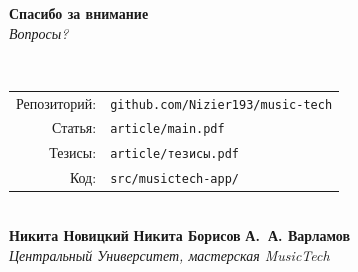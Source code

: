 \begin{frame}[plain]
  \vfill
  \begin{center}
    {\Huge\bfseries Спасибо за внимание}\\[1em]
    {\large\itshape Вопросы?}\\[1.5em]

    \\[1em]

    \small
    \begin{tabular}{rl}
      Репозиторий: & \texttt{github.com/Nizier193/music-tech}\\[0.2em]
      Статья: & \texttt{article/main.pdf}\\[0.2em]
      Тезисы: & \texttt{article/тезисы.pdf}\\[0.2em]
      Код: & \texttt{src/musictech-app/}
    \end{tabular}\\[1.5em]

    \textbf{Никита Новицкий} \quad\textbar\quad
    \textbf{Никита Борисов} \quad\textbar\quad
    \textbf{А.~А. Варламов}\\
    {\itshape Центральный Университет, мастерская MusicTech}
  \end{center}
  \vfill
\end{frame}
